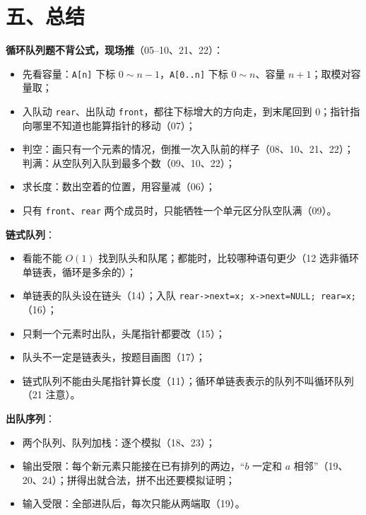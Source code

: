 \documentclass[10.5pt,a4paper,oneside]{article}
\providecommand{\tightlist}{\setlength{\itemsep}{2pt}\setlength{\parskip}{0pt}}
\newcommand{\tocback}{\par\vspace{-3pt}{\hfill\footnotesize\hyperlink{toc}{\textcolor{wdgray}{\ensuremath{\uparrow}\,回到目录}}}\par\vspace{-4pt}}
\begin{document}
\newpage

\hypertarget{ux4e94ux603bux7ed3}{%
\section{五、总结}\label{ux4e94ux603bux7ed3}}

\tocback

\begin{summarybox}

\textbf{循环队列题不背公式，现场推}（05--10、21、22）：

\begin{itemize}
\tightlist
\item
  先看容量：\texttt{A{[}n{]}} 下标 \(0\sim n-1\)，\texttt{A{[}0..n{]}}
  下标 \(0\sim n\)、容量 \(n+1\)；取模对容量取；
\item
  入队动 \texttt{rear}、出队动
  \texttt{front}，都往下标增大的方向走，到末尾回到
  0；指针指向哪里不知道也能算指针的移动（07）；
\item
  判空：画只有一个元素的情况，倒推一次入队前的样子（08、10、21、22）；判满：从空队列入队到最多个数（09、10、22）；
\item
  求长度：数出空着的位置，用容量减（06）；
\item
  只有 \texttt{front}、\texttt{rear}
  两个成员时，只能牺牲一个单元区分队空队满（09）。
\end{itemize}

\textbf{链式队列}：

\begin{itemize}
\tightlist
\item
  看能不能 \(O(1)\) 找到队头和队尾；都能时，比较哪种语句更少（12
  选非循环单链表，循环是多余的）；
\item
  单链表的队头设在链头（14）；入队
  \texttt{rear-\textgreater{}next=x;\ x-\textgreater{}next=NULL;\ rear=x;}（16）；
\item
  只剩一个元素时出队，头尾指针都要改（15）；
\item
  队头不一定是链表头，按题目画图（17）；
\item
  链式队列不能由头尾指针算长度（11）；循环单链表表示的队列不叫循环队列（21
  注意）。
\end{itemize}

\textbf{出队序列}：

\begin{itemize}
\tightlist
\item
  两个队列、队列加栈：逐个模拟（18、23）；
\item
  输出受限：每个新元素只能接在已有排列的两边，“\(b\) 一定和 \(a\)
  相邻”（19、20、24）；拼得出就合法，拼不出还要模拟证明；
\item
  输入受限：全部进队后，每次只能从两端取（19）。
\end{itemize}


\end{summarybox}
\end{document}
